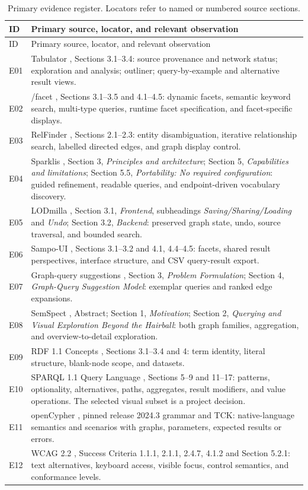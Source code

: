 \documentclass[11pt,a4paper]{article}
\begin{document}
{\small
\begin{longtable}{@{}P{1.1cm}P{14.6cm}@{}}
\caption{Primary evidence register. Locators refer to named or numbered source sections.}\label{tab:evidence}\\
\toprule ID & Primary source, locator, and relevant observation\\ \midrule
\endfirsthead\toprule ID & Primary source, locator, and relevant observation\\ \midrule\endhead
\bottomrule\endlastfoot
E01 & Tabulator \citep{tabulator}, Sections 3.1--3.4: source provenance and network status; exploration and analysis; outliner; query-by-example and alternative result views.\\
E02 & /facet \citep{facet}, Sections 3.1--3.5 and 4.1--4.5: dynamic facets, semantic keyword search, multi-type queries, runtime facet specification, and facet-specific displays.\\
E03 & RelFinder \citep{relfinder}, Sections 2.1--2.3: entity disambiguation, iterative relationship search, labelled directed edges, and graph display control.\\
E04 & Sparklis \citep{sparklis}, Section 3, \emph{Principles and architecture}; Section 5, \emph{Capabilities and limitations}; Section 5.5, \emph{Portability: No required configuration}: guided refinement, readable queries, and endpoint-driven vocabulary discovery.\\
E05 & LODmilla \citep{lodmilla}, Section 3.1, \emph{Frontend}, subheadings \emph{Saving/Sharing/Loading} and \emph{Undo}; Section 3.2, \emph{Backend}: preserved graph state, undo, source traversal, and bounded search.\\
E06 & Sampo-UI \citep{sampoui}, Sections 3.1--3.2 and 4.1, 4.4--4.5: facets, shared result perspectives, interface structure, and CSV query-result export.\\
E07 & Graph-query suggestions \citep{suggestions}, Section 3, \emph{Problem Formulation}; Section 4, \emph{Graph-Query Suggestion Model}: exemplar queries and ranked edge expansions.\\
E08 & SemSpect \citep{semspect}, Abstract; Section 1, \emph{Motivation}; Section 2, \emph{Querying and Visual Exploration Beyond the Hairball}: both graph families, aggregation, and overview-to-detail exploration.\\
E09 & RDF 1.1 Concepts \citep{rdfconcepts}, Sections 3.1--3.4 and 4: term identity, literal structure, blank-node scope, and datasets.\\
E10 & SPARQL 1.1 Query Language \citep{sparql}, Sections 5--9 and 11--17: patterns, optionality, alternatives, paths, aggregates, result modifiers, and value operations. The selected visual subset is a project decision.\\
E11 & openCypher \citep{opencypher}, pinned release 2024.3 grammar and TCK: native-language semantics and scenarios with graphs, parameters, expected results or errors.\\
E12 & WCAG 2.2 \citep{wcag}, Success Criteria 1.1.1, 2.1.1, 2.4.7, 4.1.2 and Section 5.2.1: text alternatives, keyboard access, visible focus, control semantics, and conformance levels.\\
\end{longtable}}
\end{document}
